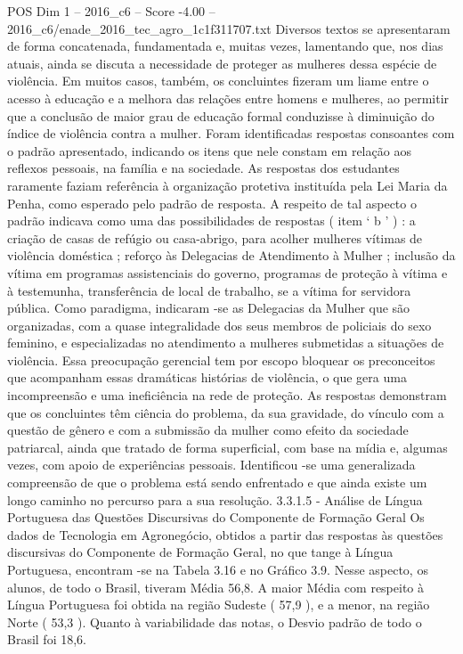 \begin{textsample}{POS Dim 1 – 2016\_c6 – Score -4.00 – 2016\_c6/enade\_2016\_tec\_agro\_1c1f311707.txt}
Diversos textos se apresentaram de forma concatenada, fundamentada e, muitas vezes, lamentando que, nos dias atuais, ainda se discuta a necessidade de proteger as mulheres dessa espécie de violência.
Em muitos casos, também, os concluintes fizeram um liame entre o acesso à educação e a melhora das relações entre homens e mulheres, ao permitir que a conclusão de maior grau de educação formal conduzisse à diminuição do índice de violência contra a mulher.
Foram identificadas respostas consoantes com o padrão apresentado, indicando os itens que nele constam em relação aos reflexos pessoais, na família e na sociedade.
As respostas dos estudantes raramente faziam referência à organização protetiva instituída pela Lei Maria da Penha, como esperado pelo padrão de resposta.
A respeito de tal aspecto o padrão indicava como uma das possibilidades de respostas ( item ‘ b ’ ) : a criação de casas de refúgio ou casa-abrigo, para acolher mulheres vítimas de violência doméstica ; reforço às Delegacias de Atendimento à Mulher ; inclusão da vítima em programas assistenciais do governo, programas de proteção à vítima e à testemunha, transferência de local de trabalho, se a vítima for servidora pública.
Como paradigma, indicaram -se as Delegacias da Mulher que são organizadas, com a quase integralidade dos seus membros de policiais do sexo feminino, e especializadas no atendimento a mulheres submetidas a situações de violência.
Essa preocupação gerencial tem por escopo bloquear os preconceitos que acompanham essas dramáticas histórias de violência, o que gera uma incompreensão e uma ineficiência na rede de proteção.
As respostas demonstram que os concluintes têm ciência do problema, da sua gravidade, do vínculo com a questão de gênero e com a submissão da mulher como efeito da sociedade patriarcal, ainda que tratado de forma superficial, com base na mídia e, algumas vezes, com apoio de experiências pessoais.
Identificou -se uma generalizada compreensão de que o problema está sendo enfrentado e que ainda existe um longo caminho no percurso para a sua resolução. 3.3.1.5 - Análise de Língua Portuguesa das Questões Discursivas do Componente de Formação Geral Os dados de Tecnologia em Agronegócio, obtidos a partir das respostas às questões discursivas do Componente de Formação Geral, no que tange à Língua Portuguesa, encontram -se na Tabela 3.16 e no Gráfico 3.9.
Nesse aspecto, os alunos, de todo o Brasil, tiveram Média 56,8.
A maior Média com respeito à Língua Portuguesa foi obtida na região Sudeste ( 57,9 ), e a menor, na região Norte ( 53,3 ).
Quanto à variabilidade das notas, o Desvio padrão de todo o Brasil foi 18,6.

\end{textsample}
